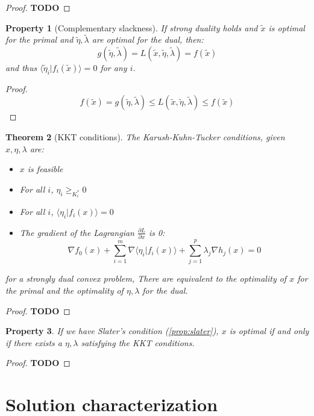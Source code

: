 \documentclass[10pt]{report}
\theoremstyle{plain}
\newtheorem{thm}{Theorem}[chapter]
\newtheorem{prop}[thm]{Property}
\theoremstyle{definition}
\theoremstyle{remark}
\newcommand{\TODO}{\textbf{TODO}}
\newcommand{\braket}[2]{\langle#1|#2\rangle}
\newcommand{\dpar}[2]{\frac{\partial{#1}}{\partial{#2}}}
\renewcommand{\geq}{\geqslant}
\renewcommand{\leq}{\leqslant}
\begin{document}
\begin{proof}
  \TODO{}
\end{proof}

\begin{prop}[Complementary slackness]
  If strong duality holds and $\tilde x$ is optimal for the primal and
  $\tilde \eta, \tilde{\lambda}$ are optimal for the dual, then:
  \[g(\tilde \eta, \tilde{\lambda}) = L(\tilde x, \tilde{\eta},\tilde{\lambda}) = f(\tilde{x})\]
  and thus $\braket {\tilde\eta_i}{f_i(\tilde{x})} = 0$ for any $i$.
\end{prop}

\begin{proof}
  \[ f(\tilde x) = g(\tilde \eta, \tilde{\lambda}) \leq
    L(\tilde x, \tilde{\eta},\tilde{\lambda}) \leq f(\tilde{x})\]
\end{proof}

\begin{thm}[KKT conditions]\label{thm:KKT}
  The Karush-Kuhn-Tucker conditions, given $x,\eta,\lambda$ are:
  \begin{itemize}
  \item $x$ is feasible
  \item For all $i$, $\eta_i \geq_{K_i^*}0$
  \item For all $i$, $\braket {\eta_i}{f_i({x})} = 0$
  \item The gradient of the Lagrangian $\dpar L x$ is 0:
    \[ \nabla f_0(x) + \sum_{i = 1}^m \nabla\braket{\eta_i}{f_i(x)} +
      \sum_{j=1}^p \lambda_j \nabla h_j(x) = 0\]
  \end{itemize}
  for a strongly dual convex problem, There are equivalent to the optimality of
  $x$ for the primal and the optimality of $\eta,\lambda$ for the dual.

\end{thm}

\begin{proof}
\TODO{}
\end{proof}

\begin{prop}\label{prop:slaterKKT}
  If we have Slater's condition (\ref{prop:slater}), $x$ is optimal if and only if there exists a
  $\eta,\lambda$ satisfying the KKT conditions.
\end{prop}

\begin{proof}
\TODO{}
\end{proof}

\section{Solution characterization}
\end{document}
